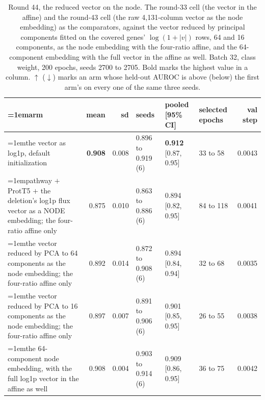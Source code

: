 \begin{table}[H]
  \centering
  \scriptsize
  \setlength{\tabcolsep}{2.5pt}
  \caption[Round 44, the reduced vector on the node]{Round 44, the reduced vector on the node. The round-33 cell (the vector in the affine) and the round-43 cell (the raw 4,131-column vector as the node embedding) as the comparators, against the vector reduced by principal components fitted on the covered genes' $\log(1 + |v|)$ rows, 64 and 16 components, as the node embedding with the four-ratio affine, and the 64-component embedding with the full vector in the affine as well. Batch 32, class weight, 200 epochs, seeds 2700 to 2705. Bold marks the highest value in a column. $\uparrow$ ($\downarrow$) marks an arm whose held-out AUROC is above (below) the first arm's on every one of the same three seeds.}
  \label{tab:w60}
  \begin{tabular}{@{}>{\raggedright\hangindent=1em\hangafter=1\arraybackslash}p{84.4mm}rrlllr@{}}
    \hline
    arm & mean & sd & seeds & pooled [95\% CI] & selected epochs & val step \\
    \hline
    the vector as log1p, default initialization & \textbf{0.908} & 0.008 & 0.896 to 0.919 (6) & \textbf{0.912} [0.87, 0.95] & 33 to 58 & 0.0043 \\
    pathway $+$ ProtT5 $+$ the deletion's log1p flux vector as a NODE embedding; the four-ratio affine only & 0.875 & 0.010 & 0.863 to 0.886 (6) & 0.894 [0.82, 0.95] & 84 to 118 & 0.0041 \\
    the vector reduced by PCA to 64 components as the node embedding; the four-ratio affine only & 0.892 & 0.014 & 0.872 to 0.908 (6) & 0.894 [0.84, 0.94] & 32 to 68 & 0.0035 \\
    the vector reduced by PCA to 16 components as the node embedding; the four-ratio affine only & 0.897 & 0.007 & 0.891 to 0.906 (6) & 0.901 [0.85, 0.95] & 26 to 55 & 0.0038 \\
    the 64-component node embedding, with the full log1p vector in the affine as well & 0.908 & 0.004 & 0.903 to 0.914 (6) & 0.909 [0.86, 0.95] & 36 to 75 & 0.0042 \\
    \hline
  \end{tabular}
\end{table}
